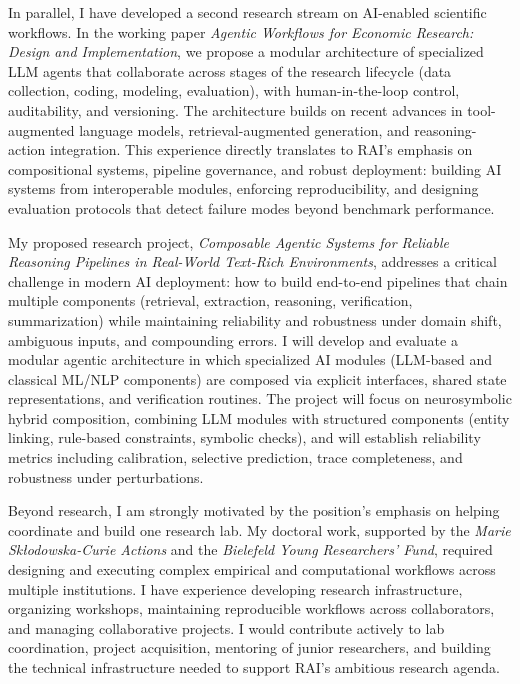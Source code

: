 \documentclass[11pt]{article}
\begin{document}
In parallel, I have developed a second research stream on AI-enabled scientific workflows. 
In the working paper \textit{Agentic Workflows for Economic Research: Design and Implementation}, we propose a modular architecture of specialized LLM agents that collaborate across stages of the research lifecycle (data collection, coding, modeling, evaluation), with human-in-the-loop control, auditability, and versioning. 
The architecture builds on recent advances in tool-augmented language models, retrieval-augmented generation, and reasoning-action integration. 
This experience directly translates to RAI's emphasis on compositional systems, pipeline governance, and robust deployment: building AI systems from interoperable modules, enforcing reproducibility, and designing evaluation protocols that detect failure modes beyond benchmark performance.

My proposed research project, \textit{Composable Agentic Systems for Reliable Reasoning Pipelines in Real-World Text-Rich Environments}, addresses a critical challenge in modern AI deployment: how to build end-to-end pipelines that chain multiple components (retrieval, extraction, reasoning, verification, summarization) while maintaining reliability and robustness under domain shift, ambiguous inputs, and compounding errors. 
I will develop and evaluate a modular agentic architecture in which specialized AI modules (LLM-based and classical ML/NLP components) are composed via explicit interfaces, shared state representations, and verification routines. 
The project will focus on neurosymbolic hybrid composition, combining LLM modules with structured components (entity linking, rule-based constraints, symbolic checks), and will establish reliability metrics including calibration, selective prediction, trace completeness, and robustness under perturbations.

Beyond research, I am strongly motivated by the position's emphasis on helping coordinate and build one research lab. 
My doctoral work, supported by the \textit{Marie Skłodowska-Curie Actions} and the \textit{Bielefeld Young Researchers' Fund}, required designing and executing complex empirical and computational workflows across multiple institutions. 
I have experience developing research infrastructure, organizing workshops, maintaining reproducible workflows across collaborators, and managing collaborative projects. 
I would contribute actively to lab coordination, project acquisition, mentoring of junior researchers, and building the technical infrastructure needed to support RAI's ambitious research agenda.
\end{document}
